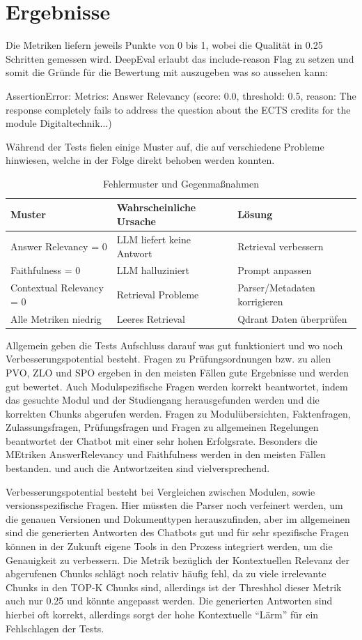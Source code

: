 \section{Ergebnisse}
Die Metriken liefern jeweils Punkte von 0 bis 1, wobei die Qualität in 0.25 Schritten gemessen wird. DeepEval erlaubt das include-reason Flag zu setzen und somit die Gründe für die Bewertung mit auszugeben was so aussehen kann:

AssertionError: Metrics: Answer Relevancy (score: 0.0, threshold: 0.5, 
reason: The response completely fails to address the question about 
the ECTS credits for the module Digitaltechnik...)

Während der Tests fielen einige Muster auf, die auf verschiedene Probleme hinwiesen, welche in der Folge direkt behoben werden konnten.

\begin{table}[htbp]
\centering
\begin{tabular}{|l|l|l|}
\hline
\textbf{Muster} & \textbf{Wahrscheinliche Ursache} & \textbf{Lösung} \\
\hline
Answer Relevancy = 0 & LLM liefert keine Antwort & Retrieval verbessern \\
Faithfulness = 0 & LLM halluziniert & Prompt anpassen \\
Contextual Relevancy = 0 & Retrieval Probleme & Parser/Metadaten korrigieren \\
Alle Metriken niedrig & Leeres Retrieval & Qdrant Daten überprüfen \\
\hline
\end{tabular}
\caption{Fehlermuster und Gegenmaßnahmen}
\end{table}


Allgemein geben die Tests Aufschluss darauf was gut funktioniert und wo noch Verbesserungspotential besteht. Fragen zu Prüfungsordnungen bzw.  zu allen PVO, ZLO und SPO ergeben in den meisten Fällen gute Ergebnisse und werden gut bewertet. Auch Modulspezifische Fragen werden korrekt beantwortet, indem das gesuchte Modul und der Studiengang herausgefunden werden und die korrekten Chunks abgerufen werden. Fragen zu Modulübersichten, Faktenfragen, Zulassungsfragen, Prüfungsfragen und Fragen zu allgemeinen Regelungen beantwortet der Chatbot mit einer sehr hohen Erfolgsrate. Besonders die MEtriken AnswerRelevancy und Faithfulness werden in den meisten Fällen bestanden. und auch die Antwortzeiten sind vielversprechend.

Verbesserungspotential besteht bei Vergleichen zwischen Modulen, sowie versionsspezifische Fragen. Hier müssten die Parser noch verfeinert werden, um die genauen Versionen und Dokumenttypen herauszufinden, aber im allgemeinen sind die generierten Antworten des Chatbots gut und für sehr spezifische Fragen können in der Zukunft eigene Tools in den Prozess integriert werden, um die Genauigkeit zu verbessern. Die Metrik bezüglich der Kontextuellen Relevanz der abgerufenen Chunks schlägt noch relativ häufig fehl, da zu viele irrelevante Chunks in den TOP-K Chunks sind, allerdings ist der Threshhol dieser Metrik auch nur 0.25 und könnte angepasst werden. Die generierten Antworten sind hierbei oft korrekt, allerdings sorgt der hohe Kontextuelle \enquote{Lärm} für ein Fehlschlagen der Tests.


